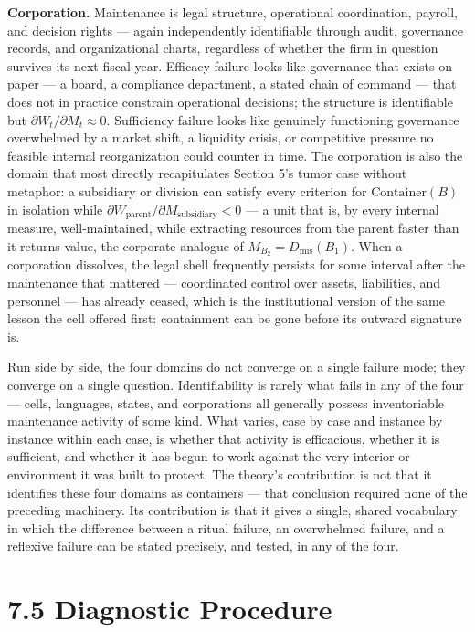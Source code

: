 \documentclass[11pt]{article}
\theoremstyle{plain}
\begin{document}
\textbf{Corporation.} Maintenance is legal structure, operational coordination, payroll, and decision rights --- again independently identifiable through audit, governance records, and organizational charts, regardless of whether the firm in question survives its next fiscal year. Efficacy failure looks like governance that exists on paper --- a board, a compliance department, a stated chain of command --- that does not in practice constrain operational decisions; the structure is identifiable but \(\partial W_t/\partial M_t \approx 0\). Sufficiency failure looks like genuinely functioning governance overwhelmed by a market shift, a liquidity crisis, or competitive pressure no feasible internal reorganization could counter in time. The corporation is also the domain that most directly recapitulates Section 5's tumor case without metaphor: a subsidiary or division can satisfy every criterion for \(\mathrm{Container}(B)\) in isolation while \(\partial W_{\mathrm{parent}}/\partial M_{\mathrm{subsidiary}} < 0\) --- a unit that is, by every internal measure, well-maintained, while extracting resources from the parent faster than it returns value, the corporate analogue of \(M_{B_2} = D_{\mathrm{mis}}(B_1)\). When a corporation dissolves, the legal shell frequently persists for some interval after the maintenance that mattered --- coordinated control over assets, liabilities, and personnel --- has already ceased, which is the institutional version of the same lesson the cell offered first: containment can be gone before its outward signature is.

Run side by side, the four domains do not converge on a single failure mode; they converge on a single question. Identifiability is rarely what fails in any of the four --- cells, languages, states, and corporations all generally possess inventoriable maintenance activity of some kind. What varies, case by case and instance by instance within each case, is whether that activity is efficacious, whether it is sufficient, and whether it has begun to work against the very interior or environment it was built to protect. The theory's contribution is not that it identifies these four domains as containers --- that conclusion required none of the preceding machinery. Its contribution is that it gives a single, shared vocabulary in which the difference between a ritual failure, an overwhelmed failure, and a reflexive failure can be stated precisely, and tested, in any of the four.

\section*{7.5 Diagnostic Procedure}
\end{document}
